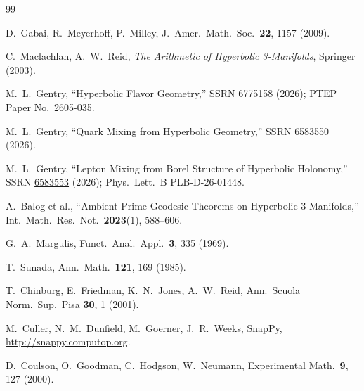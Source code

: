 \documentclass[11pt,a4paper]{article}
\theoremstyle{remark}
\begin{document}
\begin{thebibliography}{99}

D.~Gabai, R.~Meyerhoff, P.~Milley,
J.\ Amer.\ Math.\ Soc.\ \textbf{22}, 1157 (2009).

C.~Maclachlan, A.~W.~Reid,
\emph{The Arithmetic of Hyperbolic 3-Manifolds}, Springer (2003).

M.~L.~Gentry,
``Hyperbolic Flavor Geometry,''
SSRN \href{https://doi.org/10.2139/ssrn.6775158}{6775158} (2026);
PTEP Paper No.\ 2605-035.

M.~L.~Gentry,
``Quark Mixing from Hyperbolic Geometry,''
SSRN \href{https://doi.org/10.2139/ssrn.6583550}{6583550} (2026).

M.~L.~Gentry,
``Lepton Mixing from Borel Structure of Hyperbolic Holonomy,''
SSRN \href{https://doi.org/10.2139/ssrn.6583553}{6583553} (2026);
Phys.\ Lett.\ B PLB-D-26-01448.

A.~Balog et al.,
``Ambient Prime Geodesic Theorems on Hyperbolic 3-Manifolds,''
Int.\ Math.\ Res.\ Not.\ \textbf{2023}(1), 588--606.

G.~A.~Margulis,
Funct.\ Anal.\ Appl.\ \textbf{3}, 335 (1969).

T.~Sunada,
Ann.\ Math.\ \textbf{121}, 169 (1985).

T.~Chinburg, E.~Friedman, K.~N.~Jones, A.~W.~Reid,
Ann.\ Scuola Norm.\ Sup.\ Pisa \textbf{30}, 1 (2001).

M.~Culler, N.~M.~Dunfield, M.~Goerner, J.~R.~Weeks,
SnapPy, \url{http://snappy.computop.org}.

D.~Coulson, O.~Goodman, C.~Hodgson, W.~Neumann,
Experimental Math.\ \textbf{9}, 127 (2000).

\end{thebibliography}
\end{document}
